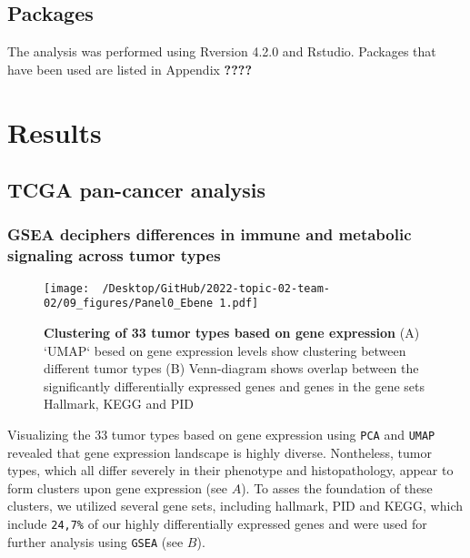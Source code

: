 \documentclass[
  parskip,
  oneside]{scrreprt}
\begin{document}
\hypertarget{packages}{%
\section{Packages}\label{packages}}

The analysis was performed using Rversion 4.2.0 and Rstudio. Packages
that have been used are listed in Appendix \textbf{????}

\hypertarget{results}{%
\chapter{Results}\label{results}}

\hypertarget{tcga-pan-cancer-analysis-1}{%
\section{TCGA pan-cancer analysis}\label{tcga-pan-cancer-analysis-1}}

\hypertarget{gsea-deciphers-differences-in-immune-and-metabolic-signaling-across-tumor-types}{%
\subsection{GSEA deciphers differences in immune and metabolic signaling
across tumor
types}\label{gsea-deciphers-differences-in-immune-and-metabolic-signaling-across-tumor-types}}

\begin{figure}[h]
 \begin{center}
   \texttt{[image: ~/Desktop/GitHub/2022-topic-02-team-02/09\_figures/Panel0\_Ebene 1.pdf]}
  \end{center}
  \caption{\textbf{Clustering of 33 tumor types based on gene expression} (A) `UMAP` besed on gene expression levels show clustering between different tumor types (B) Venn-diagram shows overlap between the significantly differentially expressed genes and genes in the gene sets Hallmark, KEGG and PID}
  \label{UMAP}
\end{figure}

Visualizing the 33 tumor types based on gene expression using
\texttt{PCA} and \texttt{UMAP} revealed that gene expression landscape
is highly diverse. Nontheless, tumor types, which all differ severely in
their phenotype and histopathology, appear to form clusters upon gene
expression (see  \(A\)). To asses the foundation of these
clusters, we utilized several gene sets, including hallmark, PID and
KEGG, which include \texttt{24,7\%} of our highly differentially
expressed genes and were used for further analysis using \texttt{GSEA}
(see  \(B\)).
\end{document}
